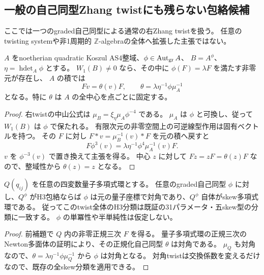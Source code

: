 \subsection{一般の自己同型Zhang twistにも残らない包絡候補}
\label{subsec:general-zhang-exclusions}
ここでは一つのgraded自己同型による通常の右Zhang twistを扱う。
任意のtwisting systemや非1周期的 $\mathbb Z$-algebraの全体へ拡張した主張ではない。

\begin{lemma}[反標準三次の固有成分によるtwist輸送]
\label{lem:general-zhang-cubic-eigen}
$A$ をnoetherian quadratic Koszul AS4整域、$\phi\in\operatorname{Aut}_{\rm gr}A$、
$B=A^\phi$、$\eta=\operatorname{hdet}_A\phi$ とする。
$W_1(B)\ne0$ なら、その中に $\phi(F)=\lambda F$ を満たす非零元が存在し、
$A$ の積では
\[
 Fv=\theta(v)F,\qquad
 \theta=\lambda\eta^{-1}\phi\mu_A^{-1}
\]
となる。特に $\theta$ は $A$ の全中心を点ごとに固定する。
\end{lemma}
\begin{proof}
右twistの中山公式は $\mu_B=\xi_\eta\mu_A\phi^{-4}$ である。
$\mu_A$ は $\phi$ と可換し、従って $W_1(B)$ は $\phi$ で保たれる。
有限次元の非零空間上の可逆線型作用は固有ベクトルを持つ。
その $F$ に対し $F*v=\mu_B^{-1}(v)*F$ を元の積へ戻すと
\[
 F\phi^3(v)=\lambda\eta^{-1}\phi^4\mu_A^{-1}(v)F.
\]
$v$ を $\phi^{-3}(v)$ で置き換えて主張を得る。
中心 $z$ に対して $Fz=zF=\theta(z)F$ なので、整域性から $\theta(z)=z$ となる。
\end{proof}

\begin{theorem}
\label{thm:all-twisted-skew-exclusion}
$Q(q_{ij})$ を任意の四変数量子多項式環とする。
任意のgraded自己同型 $\phi$ に対し、$Q^\phi$ がH3包絡ならば
$\phi$ は元の量子座標で対角であり、$Q^\phi$ 自体がskew多項式環である。
従ってこのtwist全体のH3分類は既証の31パラメータ・五skew型の分類に一致する。
$\phi$ の単冪性や半単純性は仮定しない。
\end{theorem}
\begin{proof}
前補題で $Q$ 内の非零正規三次 $F$ を得る。
量子多項式環の正規三次のNewton多面体の証明により、その正規化自己同型 $\theta$ は対角である。
$\mu_Q$ も対角なので、$\theta=\lambda\eta^{-1}\phi\mu_Q^{-1}$ から $\phi$ は対角となる。
対角twistは交換係数を変えるだけなので、既存の全skew分類を適用できる。
\end{proof}

